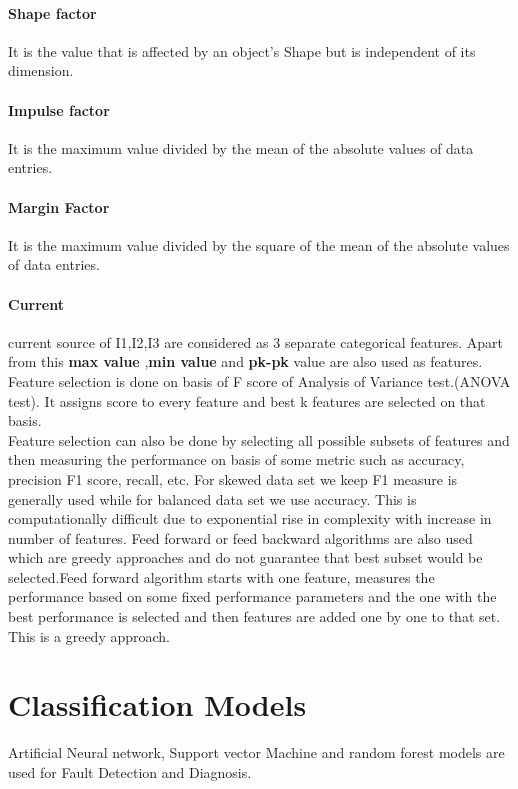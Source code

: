 \paragraph{Shape factor}
It is the  value that is affected by an object's Shape but is independent of its dimension.
\paragraph{Impulse factor}
It is the maximum value divided by the mean of the absolute values of data entries.
\paragraph{Margin Factor}
It is the maximum value divided by the square of the mean of the absolute values of data entries.
\paragraph{Current}
 current source of I1,I2,I3 are considered as 3 separate categorical features.
 \newline
 \newline
 Apart from this \textbf{max value} ,\textbf{min value} and \textbf{pk-pk} value are also used as features.\\
\newline
 Feature selection is done on basis of F score of Analysis of Variance test.(ANOVA test). It assigns score to every feature and best k features are selected on that basis.\\
\newline
 Feature selection can also be done by selecting all possible subsets of features and then measuring the performance on basis of some metric such as accuracy, precision F1 score, recall, etc. For skewed data set we keep F1 measure is generally used while for balanced data set we use accuracy. This is computationally difficult due to exponential rise in complexity with increase in number of features. Feed forward or feed backward algorithms are also used which are greedy approaches and do not guarantee that best subset would be selected.Feed forward algorithm starts with one feature, measures the performance based on some fixed performance parameters and the one with the best performance is selected and then features are added one by one to that set. This is a greedy approach.\\
\section{Classification Models}
 Artificial Neural network, Support vector Machine and random forest models are used for Fault Detection and Diagnosis.
